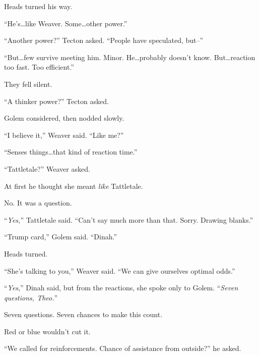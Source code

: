 Heads turned his way.



``He's\ldots like Weaver.  Some\ldots other power.''



``Another power?''  Tecton asked.  ``People have speculated, but--''



``But\ldots few survive meeting him.  Minor.  He\ldots probably doesn't know.  But\ldots reaction too fast.  Too efficient.''



They fell silent.



``A thinker power?'' Tecton asked.



Golem considered, then nodded slowly.



``I believe it,'' Weaver said.  ``Like me?''



``Senses things\ldots that kind of reaction time.''



``Tattletale?'' Weaver asked.



At first he thought she meant \emph{like} Tattletale.



No.  It was a question.



``\emph{Yes,}'' Tattletale said.  ``Can't say much more than that.  Sorry.  Drawing blanks.''



``Trump card,'' Golem said.  ``Dinah.''



Heads turned.



``She's talking to you,'' Weaver said.  ``We can give ourselves optimal odds.''



``\emph{Yes},'' Dinah said, but from the reactions, she spoke only to Golem.  ``\emph{Seven questions, Theo.}''



Seven questions.  Seven chances to make this count.



Red or blue wouldn't cut it.



``We called for reinforcements.  Chance of assistance from outside?'' he asked.



